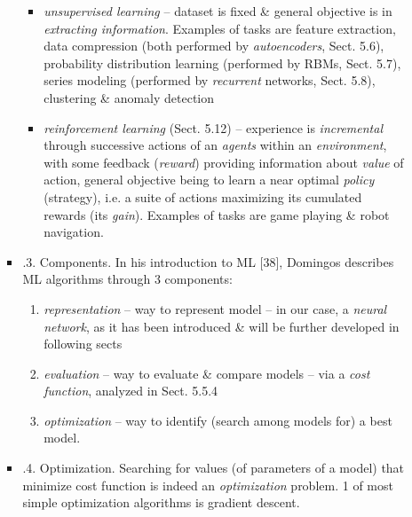 \documentclass{article}
\begin{document}
\begin{itemize}
\begin{itemize}
\begin{itemize}
\begin{itemize}
				\item {\it unsupervised learning} -- dataset is fixed \& general objective is in {\it extracting information}. Examples of tasks are feature extraction, data compression (both performed by {\it autoencoders}, Sect. 5.6), probability distribution learning (performed by RBMs, Sect. 5.7), series modeling (performed by {\it recurrent} networks, Sect. 5.8), clustering \& anomaly detection
				\item {\it reinforcement learning} (Sect. 5.12) -- experience is {\it incremental} through successive actions of an {\it agents} within an {\it environment}, with some feedback ({\it reward}) providing information about {\it value} of action, general objective being to learn a near optimal {\it policy} (strategy), i.e. a suite of actions maximizing its cumulated rewards (its {\it gain}). Examples of tasks are game playing \& robot navigation.
			\end{itemize}
			\item {.3. Components.} In his introduction to ML [38], {\sc Domingos} describes ML algorithms through 3 components:
			\begin{enumerate}
				\item {\it representation} -- way to represent model -- in our case, a {\it neural network}, as it has been introduced \& will be further developed in following sects
				\item {\it evaluation} -- way to evaluate \& compare models -- via a {\it cost function}, analyzed in Sect. 5.5.4
				\item {\it optimization} -- way to identify (search among models for) a best model.
			\end{enumerate}
			\item {.4. Optimization.} Searching for values (of parameters of a model) that minimize cost function is indeed an {\it optimization} problem. 1 of most simple optimization algorithms is gradient descent.


\end{itemize}
\end{itemize}
\end{itemize}
\end{document}
